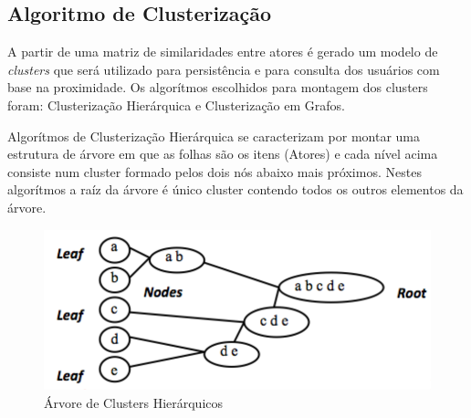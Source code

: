 \documentclass[
	12pt,				%
    oneside,			%
	a4paper,			%
	english,			%
	french,				%
	spanish,			%
	brazil,				%
	]{abntex2}
\begin{document}
\subsection{Algoritmo de Clusterização}
A partir de uma matriz de similaridades entre atores é gerado um modelo de \textit{clusters} que será utilizado para persistência e para consulta dos usuários com base na proximidade. Os algorítmos escolhidos para montagem dos clusters foram: 
Clusterização Hierárquica e Clusterização em Grafos. 

Algorítmos de Clusterização Hierárquica se caracterizam por montar uma estrutura de árvore em que as folhas são os itens (Atores) e cada nível acima consiste num cluster formado pelos dois nós abaixo mais próximos. Nestes algorítmos a raíz da árvore é
único cluster contendo todos os outros elementos da árvore.

\begin{figure}[hbt]
	\label{Árvore de Clusters Hierárquicos}
	\caption{Árvore de Clusters Hierárquicos}
	\includegraphics{hierarquical-clustering-01.png}
\end{figure}





\end{document}
